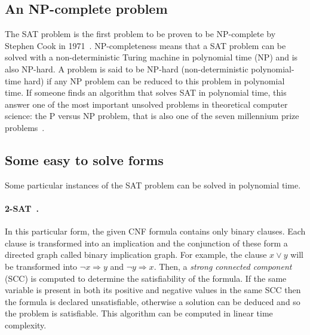\subsection{An NP-complete problem}
The SAT problem is the first problem to be proven to be NP-complete by Stephen Cook in 1971~\cite{cook1971complexity}.
NP-completeness means that a SAT problem can be solved with a non-deterministic Turing machine in polynomial time (NP) and is also NP-hard.
A problem is said to be NP-hard (non-deterministic polynomial-time hard) if 
any NP problem can be reduced to this problem in polynomial time.
If someone finds an algorithm that solves SAT in polynomial time, this answer 
one of the most important unsolved problems in theoretical computer science: the P versus NP problem,
 that is also one of the seven millennium prize problems~\cite{carlson2006millennium}.
 
 

\subsection{Some easy to solve forms}
Some particular instances of the SAT problem can be solved in polynomial time.

\paragraph{2-SAT~\cite{aspvall1979linear}.}

In this particular form, the given CNF formula contains only binary clauses.
Each clause is transformed into an implication and the conjunction of these form a directed graph called
binary implication graph.
For example, the clause $x \lor y$ will be transformed into $ \neg x \Rightarrow y$ and $\neg y \Rightarrow x$.
Then, a \emph{strong connected component} (SCC) is computed to determine the satisfiability of the formula.
If the same variable is present in both its positive and negative values in the same SCC then the formula is declared unsatisfiable,
otherwise a solution can be deduced and so the problem is satisfiable. 
This algorithm can be computed in linear time complexity.



